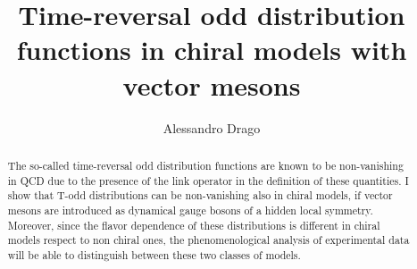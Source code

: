 \documentclass[]{revtex4}
\begin{document}
\title{Time-reversal odd distribution functions in chiral 
models with vector mesons} 
\author{Alessandro Drago}
\address{Dipartimento di Fisica, Universit{\`a} di Ferrara and
INFN, Sezione di Ferrara, 44100 Ferrara, Italy}





\begin{abstract}
The so-called time-reversal odd distribution functions
are known to be non-vanishing in QCD due to the presence
of the link operator in the definition of these quantities.
I show that T-odd distributions can be
non-vanishing also in chiral models, if vector mesons are
introduced as dynamical gauge bosons of a hidden local symmetry. 
Moreover, since the flavor dependence of these distributions
is different in chiral models respect to non chiral ones, 
the phenomenological analysis
of experimental data will be able to distinguish between
these two classes of models.
\end{abstract}


\noindent


\maketitle
\end{document}
